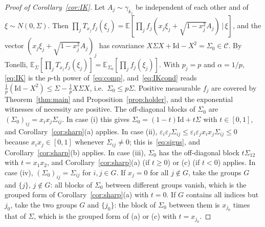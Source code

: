 \documentclass[11pt]{amsart}
\theoremstyle{definition}
\newcommand{\E}{\mathbb{E}}
\newcommand{\Id}{\mathrm{Id}}
\begin{document}
\begin{proof}[Proof of Corollary~\ref{cor:IK}]
Let $A_j\sim\gamma_{k_j}$ be independent of each other and of $\xi\sim N(0,\Sigma)$. Then
$\prod_jT_{x_j}f_j(\xi_j)=\E[\prod_jf_j(x_j\xi_j+\sqrt{1-x_j^2}A_j)\,|\,\xi]$, and the vector
$(x_j\xi_j+\sqrt{1-x_j^2}A_j)_j$ has covariance $X\Sigma X+\Id-X^2=\Sigma_0\in\mathcal C$. By Tonelli,
$\E_\Sigma[\prod_jT_{x_j}f_j(\xi_j)]=\E_{\Sigma_0}[\prod_jf_j(\xi_j)]$. With $p_j=p$ and $\alpha=1/p$,
\eqref{eq:IK} is the $p$-th power of~\eqref{eq:comp}, and~\eqref{eq:IKcond} reads
$\frac1p(\Id-X^2)\le\Sigma-\frac1pX\Sigma X$, i.e.\ $\Sigma_0\le p\Sigma$. Positive measurable $f_j$ are covered by
Theorem~\ref{thm:main} and Proposition~\ref{prop:holder}, and the exponential witnesses of necessity are positive.
The off-diagonal blocks of $\Sigma_0$ are $(\Sigma_0)_{ij}=x_ix_j\Sigma_{ij}$. In case (i) this gives
$\Sigma_0=(1-t)\Id+t\Sigma$ with $t\in[0,1]$, and Corollary~\ref{cor:sharp}(a) applies. In case (ii),
$\varepsilon_i\varepsilon_j\Sigma_{ij}\le\varepsilon_i\varepsilon_jx_ix_j\Sigma_{ij}\le0$ because $x_ix_j\in[0,1]$ whenever
$\Sigma_{ij}\ne0$; this is~\eqref{eq:signs}, and Corollary~\ref{cor:sharp}(b) applies. In case (iii), $\Sigma_0$ has
the off-diagonal block $t\Sigma_{12}$ with $t=x_1x_2$, and Corollary~\ref{cor:sharp}(a) (if $t\ge0$) or (c) (if
$t<0$) applies. In case (iv), $(\Sigma_0)_{ij}=\Sigma_{ij}$ for $i,j\in G$. If $x_j=0$ for all $j\notin G$, take the
groups $G$ and $\{j\}$, $j\notin G$: all blocks of $\Sigma_0$ between different groups vanish, which is the grouped
form of Corollary~\ref{cor:sharp}(a) with $t=0$. If $G$ contains all indices but $j_0$, take the two groups $G$ and
$\{j_0\}$: the block of $\Sigma_0$ between them is $x_{j_0}$ times that of $\Sigma$, which is the grouped form of
(a) or (c) with $t=x_{j_0}$.
\end{proof}
\end{document}
